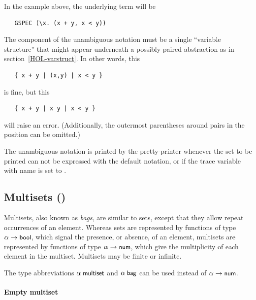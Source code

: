 In the example above, the underlying  term will be
\begin{hol}
\begin{verbatim}
   GSPEC (\x. (x + y, x < y))
\end{verbatim}
\end{hol}

The  component of the unambiguous notation must be a single
``variable structure'' that might appear underneath a possibly paired
abstraction as in section~\ref{HOL-varstruct}.  In other words, this
\begin{hol}
\begin{verbatim}
   { x + y | (x,y) | x < y }
\end{verbatim}
\end{hol}
is fine, but this
\begin{hol}
\begin{verbatim}
   { x + y | x y | x < y }
\end{verbatim}
\end{hol}
will raise an error.  (Additionally, the outermost parentheses around
pairs in the  position can be omitted.)

The unambiguous notation is printed by the pretty-printer whenever the
set to be printed can not be expressed with the default notation, or
if the trace variable with name 
is set to .


\subsection{Multisets ()}\label{multiset}

Multisets, also known as \emph{bags}, are similar to sets, except that
they allow repeat occurrences of an element. Whereas sets are
represented by functions of type $\alpha\to\mbox{\small{\textbf{\sf{bool}}}}$, which signal
the presence, or absence, of an element, multisets are represented
by functions of type $\alpha\to\mbox{\small{\textbf{\sf{num}}}}$, which give the
multiplicity of each element in the multiset. Multisets may be finite
or infinite.

The type abbreviations $\alpha\;\mbox{\small{\textbf{\sf{multiset}}}}$ and
$\alpha\;\mbox{\small{\textbf{\sf{bag}}}}$ can be used instead of $\alpha\to\mbox{\small{\textbf{\sf{num}}}}$.

\paragraph {Empty multiset}


